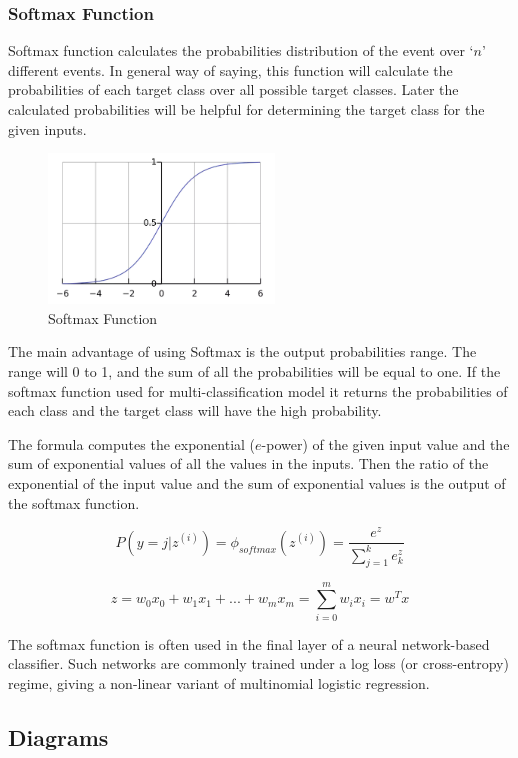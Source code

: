 \documentclass[conference,compsoc]{IEEEtran}
\begin{document}
\subsubsection{Softmax Function}

Softmax function calculates the probabilities distribution of the event over ‘$n$’ different events. In general way of saying, this function will calculate the probabilities of each target class over all possible target classes. Later the calculated probabilities will be helpful for determining the target class for the given inputs.

\begin{figure}[H]
    \centering
    \includegraphics[width=6cm]{images/softmax-function.png}
    \caption{Softmax Function}
\end{figure}

The main advantage of using Softmax is the output probabilities range. The range will 0 to 1, and the sum of all the probabilities will be equal to one. If the softmax function used for multi-classification model it returns the probabilities of each class and the target class will have the high probability.

The formula computes the exponential ($e$-power) of the given input value and the sum of exponential values of all the values in the inputs. Then the ratio of the exponential of the input value and the sum of exponential values is the output of the softmax function.

\[
    P(y = j | z^{(i)}) = \phi_{softmax} (z^{(i)}) = \frac{e^z}{\sum_{j=1}^{k} e^z_k}
\]

\[
    z = w_0x_0 + w_1x_1 + ... + w_mx_m = \sum_{i=0}^{m} w_ix_i = w^Tx
\]

The softmax function is often used in the final layer of a neural network-based classifier. Such networks are commonly trained under a log loss (or cross-entropy) regime, giving a non-linear variant of multinomial logistic regression.

\subsection{Diagrams}
\end{document}
